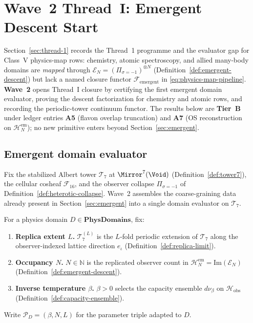 \section{Wave~2 Thread~I: Emergent Descent Start}
\label{sec:wave2-thread1}

Section~\ref{sec:thread-1} records the Thread~1 programme and the evaluator
gap for Class~V physics-map rows: chemistry, atomic spectroscopy, and allied
many-body domains are \emph{mapped} through
$\mathcal{E}_N=(\Pi_{\sigma=-1})^{\otimes N}$ (Definition~\ref{def:emergent-descent})
but lack a named closure functor $\mathcal{F}_{\mathrm{emergent}}$ in
\eqref{eq:physics-map-pipeline}. \textbf{Wave~2} opens Thread~I closure by
certifying the first emergent domain evaluator, proving the descent
factorization for chemistry and atomic rows, and recording the periodic-tower
continuum functor. The results below are \textbf{Tier~B} under ledger entries
\textbf{A5} (flavon overlap truncation) and \textbf{A7} (OS reconstruction on
$\mathcal{H}_N^{\mathrm{em}}$); no new primitive enters beyond
Section~\ref{sec:emergent}.

\subsection{Emergent domain evaluator}
\label{sec:wave2-thread1:evaluator}

Fix the stabilized Albert tower $\mathcal{T}_7$ at $\Mirror^7(\Void)$
(Definition~\ref{def:tower7}), the cellular cosheaf $\mathcal{F}_{16}$, and the
observer collapse $\Pi_{\sigma=-1}$ of Definition~\ref{def:heterotic-collapse}.
Wave~2 assembles the coarse-graining data already present in
Section~\ref{sec:emergent} into a single domain evaluator on $\mathcal{T}_7$.

\begin{definition}
\label{def:thread1-coarse-params}
For a physics domain $D\in\mathbf{PhysDomains}$, fix:
\begin{enumerate}[label=(\roman*),leftmargin=*]
  \item \textbf{Replica extent $L$.}
    $\mathcal{T}_7^{(L)}$ is the $L$-fold periodic extension of $\mathcal{T}_7$
    along the observer-indexed lattice direction $e_\iota$
    (Definition~\ref{def:replica-limit}).
  \item \textbf{Occupancy $N$.}
    $N\in\mathbb{N}$ is the replicated observer count in
    $\mathcal{H}_N^{\mathrm{em}}=\mathrm{Im}(\mathcal{E}_N)$
    (Definition~\ref{def:emergent-descent}).
  \item \textbf{Inverse temperature $\beta$.}
    $\beta>0$ selects the capacity ensemble $d\nu_\beta$ on
    $\mathcal{H}_{\mathrm{obs}}$ (Definition~\ref{def:capacity-ensemble}).
\end{enumerate}
Write $\mathcal{P}_D=(\beta,N,L)$ for the parameter triple adapted to $D$.
\end{definition}

